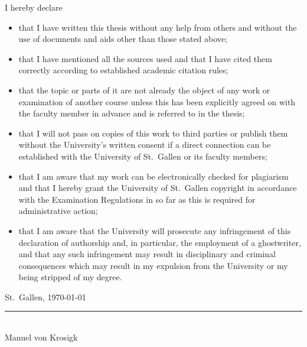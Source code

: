 
I hereby declare
\begin{itemize}
	\item that I have written this thesis without any help from others and without the use of documents and aids other than those stated above;
	\item that I have mentioned all the sources used and that I have cited them correctly according to established academic citation rules;
	\item that the topic or parts of it are not already the object of any work or examination of another course unless this has been explicitly agreed on with the faculty member in advance and is referred to in the thesis;
	\item that I will not pass on copies of this work to third parties or publish them without the University’s written consent if a direct connection can be established with the University of St.~Gallen or its faculty members;
	\item that I am aware that my work can be electronically checked for plagiarism and that I hereby grant the University of St.~Gallen copyright in accordance with the Examination Regulations in so far as this is required for administrative action;
	\item that I am aware that the University will prosecute any infringement of this declaration of authorship and, in particular, the employment of a ghostwriter, and that any such infringement may result in disciplinary and criminal consequences which may result in my expulsion from the University or my being stripped of my degree.
\end{itemize}

\noindent St.~Gallen, \today\\[.5cm]
\newline \rule{4cm}{.5pt}\\
Manuel von Krosigk
%
%
